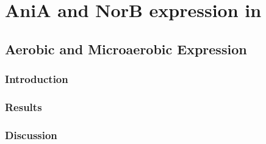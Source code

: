 \chapter{AniA and NorB expression in \Nm{}}
\section{Aerobic and Microaerobic Expression}
\subsection{Introduction}
\subsection{Results}
\subsection{Discussion}